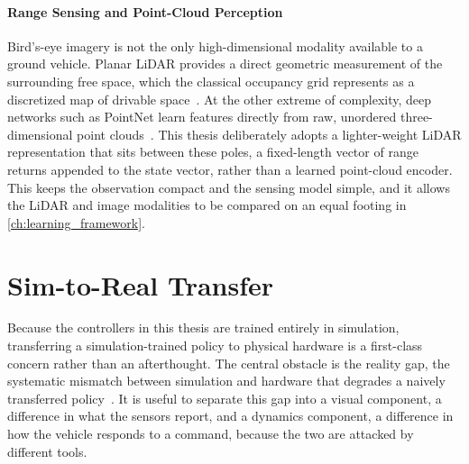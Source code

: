 \paragraph{Range Sensing and Point-Cloud Perception}
Bird's-eye imagery is not the only high-dimensional modality available to a ground vehicle. Planar LiDAR provides a direct geometric measurement of the surrounding free space, which the classical occupancy grid represents as a discretized map of drivable space~\cite{elfes1989occupancy}. At the other extreme of complexity, deep networks such as PointNet learn features directly from raw, unordered three-dimensional point clouds~\cite{qi2017pointnet}. This thesis deliberately adopts a lighter-weight LiDAR representation that sits between these poles, a fixed-length vector of range returns appended to the state vector, rather than a learned point-cloud encoder. This keeps the observation compact and the sensing model simple, and it allows the LiDAR and image modalities to be compared on an equal footing in \cref{ch:learning_framework}.

\section{Sim-to-Real Transfer}

Because the controllers in this thesis are trained entirely in simulation, transferring a simulation-trained policy to physical hardware is a first-class concern rather than an afterthought. The central obstacle is the reality gap, the systematic mismatch between simulation and hardware that degrades a naively transferred policy~\cite{zhao2020sim2real}. It is useful to separate this gap into a visual component, a difference in what the sensors report, and a dynamics component, a difference in how the vehicle responds to a command, because the two are attacked by different tools.

